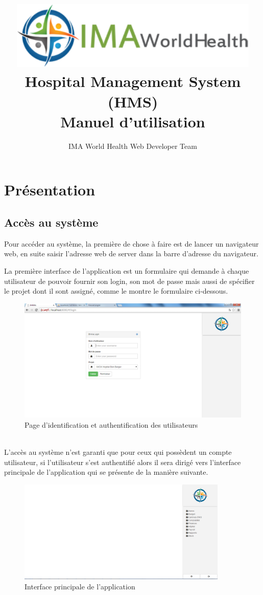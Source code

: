 \documentclass[12pt,a4paper]{report}
\author{IMA World Health Web Developer Team}
\title{\includegraphics[width=12cm]{ima.png} \\Hospital Management System\\ (HMS) \\ Manuel d'utilisation}
\begin{document}
\maketitle 
\chapter{Présentation}
\section{Accès au système}
\large{Pour accéder au système, la première de chose à faire est de lancer un navigateur web, en suite saisir l'adresse web de server dans la barre d'adresse du navigateur.}

La première interface de l'application est un formulaire qui demande à chaque utilisateur de pouvoir fournir son login, son mot de passe mais aussi de spécifier  le projet dont il sont assigné, comme le montre le formulaire ci-dessous.
\begin{figure}[h]
\begin{center}
\includegraphics[width=12cm]{pic/login.png}
\end{center}
\caption{Page d'identification et authentification des utilisateurs}
\label{Page d'identification et authentification des utilisateurs}
\end{figure}
\\ L'accès au système n'est garanti que pour ceux qui possèdent un compte utilisateur, si l'utilisateur s'est authentifié alors il sera dirigé vers l'interface principale de l'application qui se présente de la manière suivante.
\newpage
\begin{figure}[h]
\begin{center}
\includegraphics[width=10cm]{pic/mainInterface.png}
\end{center}
\caption{Interface principale de l'application}
\label{Interface principale de l'application}
\end{figure} 
\end{document}
